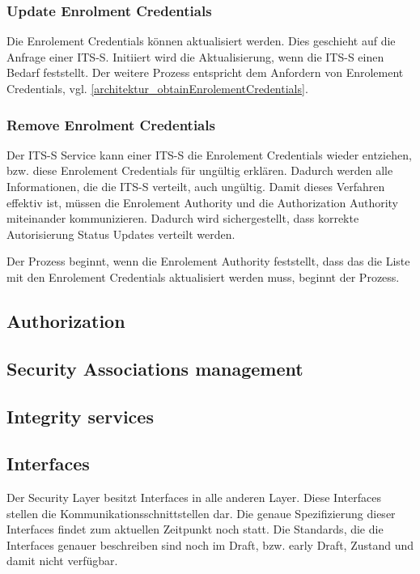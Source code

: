  
\subsubsection{Update Enrolment Credentials}
Die Enrolement Credentials können aktualisiert werden. Dies geschieht auf die Anfrage einer \ac{ITS-S}. Initiiert wird die Aktualisierung, wenn die \ac{ITS-S}  einen Bedarf feststellt. Der weitere Prozess entspricht dem Anfordern von Enrolement Credentials, vgl. \autoref{architektur_obtainEnrolementCredentials}.

\subsubsection{Remove Enrolment Credentials}
Der \ac{ITS-S} Service kann einer \ac{ITS-S} die Enrolement Credentials wieder entziehen, bzw. diese Enrolement Credentials für ungültig erklären. Dadurch werden alle Informationen, die die \ac{ITS-S} verteilt, auch ungültig. Damit dieses Verfahren effektiv ist, müssen die Enrolement Authority und die Authorization Authority miteinander kommunizieren. Dadurch wird sichergestellt, dass korrekte Autorisierung Status Updates verteilt werden. 

Der Prozess beginnt, wenn die Enrolement Authority feststellt, dass das die Liste mit den Enrolement Credentials aktualisiert werden muss, beginnt der Prozess.  


\subsection{Authorization \label{architektur_authorization}}

\subsection{Security Associations management}

\subsection{Integrity services}



\subsection{Interfaces}
Der Security Layer besitzt Interfaces in alle anderen Layer. Diese Interfaces stellen die Kommunikationsschnittstellen dar. Die genaue Spezifizierung dieser Interfaces findet zum aktuellen Zeitpunkt noch statt. Die Standards, die die  Interfaces genauer beschreiben sind noch im  \glqq Draft\grqq , bzw. \glqq early Draft\grqq , Zustand und damit nicht verfügbar. 

